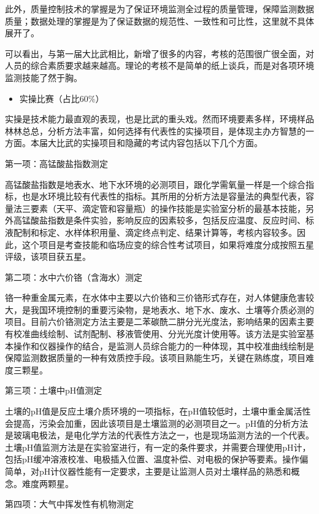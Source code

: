 \documentclass[
]{book}
\providecommand{\tightlist}{%
  \setlength{\itemsep}{0pt}\setlength{\parskip}{0pt}}
\begin{document}
此外，质量控制技术的掌握是为了保证环境监测全过程的质量管理，保障监测数据质量；数据处理的掌握是为了保证数据的规范性、一致性和可比性，这里就不具体展开了。

可以看出，与第一届大比武相比，新增了很多的内容，考核的范围很广很全面，对人员的综合素质要求越来越高。理论的考核不是简单的纸上谈兵，而是对各项环境监测技能了然于胸。

\begin{itemize}
\tightlist
\item
  实操比赛（占比60\%）
\end{itemize}

实操是技术能力最直观的表现，也是比武的重头戏。然而环境要素多样，环境样品林林总总，分析方法丰富，如何选择有代表性的实操项目，是体现主办方智慧的一方面。本届大比武的实操项目和隐藏的考试内容包括以下几个方面。

第一项：高锰酸盐指数测定

高锰酸盐指数是地表水、地下水环境的必测项目，跟化学需氧量一样是一个综合指标，也是水环境比较有代表性的指标。其所用的分析方法是容量法的典型代表，容量法三要素（天平、滴定管和容量瓶）的操作技能是实验室分析的最基本技能，另外高锰酸盐指数是条件实验，影响反应的因素较多，包括反应温度、反应时间、标液配制和标定、水样体积用量、滴定终点判定、结果计算等，考核内容较多。因此，这个项目是考查技能和临场应变的综合性考试项目，如果将难度分成按照五星评级，该项目获五星。

第二项：水中六价铬（含海水）测定

铬一种重金属元素，在水体中主要以六价铬和三价铬形式存在，对人体健康危害较大，是我国环境控制的重要污染物，是地表水、地下水、废水、土壤等介质必测的项目。目前六价铬测定方法主要是二苯碳酰二肼分光光度法，影响结果的因素主要有校准曲线绘制、试剂配制、移液管使用、分光光度计使用等。该方法是实验室基本操作和仪器操作的结合，是监测人员综合能力的一种体现，其中校准曲线绘制是保障监测数据质量的一种有效质控手段。该项目熟能生巧，关键在熟练度，项目难度三颗星。

第三项：土壤中pH值测定

土壤的pH值是反应土壤介质环境的一项指标，在pH值较低时，土壤中重金属活性会提高，污染会加重，因此该项目是土壤监测的必测项目之一。pH值的分析方法是玻璃电极法，是电化学方法的代表性方法之一，也是现场监测方法的一个代表。土壤pH值监测方法是在实验室进行，有一定的条件要求，并需要合理使用pH计，包括pH缓冲溶液校准、电极插入位置、温度补偿、对电极的保护等要素。操作偏简单，对pH计仪器性能有一定要求，主要是让监测人员对土壤样品的熟悉和概念。难度两颗星。

第四项：大气中挥发性有机物测定
\end{document}
